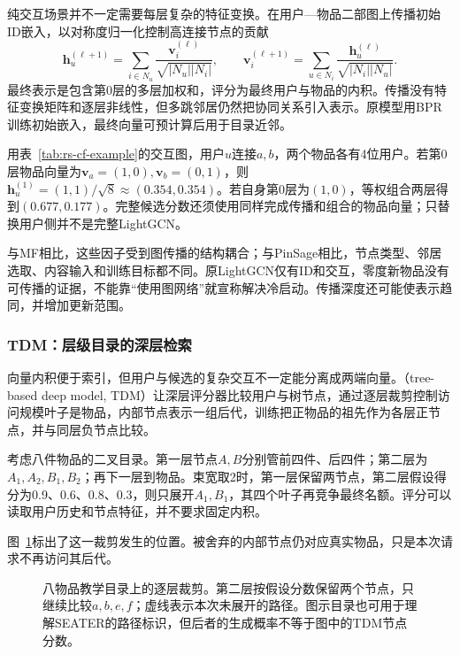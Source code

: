 纯交互场景并不一定需要每层复杂的特征变换。在用户—物品二部图上传播初始ID嵌入，以对称度归一化控制高连接节点的贡献
\begin{equation}
 \bm h_u^{(\ell+1)}
 =\sum_{i\in N_u}\frac{\bm v_i^{(\ell)}}{\sqrt{|N_u||N_i|}},
 \qquad
 \bm v_i^{(\ell+1)}
 =\sum_{u\in N_i}\frac{\bm h_u^{(\ell)}}{\sqrt{|N_i||N_u|}}.
 \label{eq:rs-lightgcn}
\end{equation}
最终表示是包含第0层的多层加权和，评分为最终用户与物品的内积。传播没有特征变换矩阵和逐层非线性，但多跳邻居仍然把协同关系引入表示。原模型用BPR训练初始嵌入，最终向量可预计算后用于目录近邻。

用表~\ref{tab:rs-cf-example}的交互图，用户$u$连接$a,b$，两个物品各有4位用户。若第0层物品向量为$\bm v_a=(1,0),\bm v_b=(0,1)$，则$\bm h_u^{(1)}=(1,1)/\sqrt8\approx(0.354,0.354)$。若自身第0层为$(1,0)$，等权组合两层得到$(0.677,0.177)$。完整候选分数还须使用同样完成传播和组合的物品向量；只替换用户侧并不是完整LightGCN。

与MF相比，这些因子受到图传播的结构耦合；与PinSage相比，节点类型、邻居选取、内容输入和训练目标都不同。原LightGCN仅有ID和交互，零度新物品没有可传播的证据，不能靠“使用图网络”就宣称解决冷启动。传播深度还可能使表示趋同，并增加更新范围。

\Needspace{90mm}
\subsubsection{TDM：层级目录的深层检索}
\label{sec:rs-tdm}

向量内积便于索引，但用户与候选的复杂交互不一定能分离成两端向量。（tree-based deep model, TDM）让深层评分器比较用户与树节点，通过逐层裁剪控制访问规模叶子是物品，内部节点表示一组后代，训练把正物品的祖先作为各层正节点，并与同层负节点比较。

考虑八件物品的二叉目录。第一层节点$A,B$分别管前四件、后四件；第二层为$A_1,A_2,B_1,B_2$；再下一层到物品。束宽取2时，第一层保留两节点，第二层假设得分为0.9、0.6、0.8、0.3，则只展开$A_1,B_1$，其四个叶子再竞争最终名额。评分可以读取用户历史和节点特征，并不要求固定内积。

图~\ref{fig:rs-tree-retrieval}标出了这一裁剪发生的位置。被舍弃的内部节点仍对应真实物品，只是本次请求不再访问其后代。
\begin{figure}[htbp]
 \centering
 
 \caption{八物品教学目录上的逐层裁剪。第二层按假设分数保留两个节点，只继续比较$a,b,e,f$；虚线表示本次未展开的路径。图示目录也可用于理解SEATER的路径标识，但后者的生成概率不等于图中的TDM节点分数。}
 \label{fig:rs-tree-retrieval}
\end{figure}

